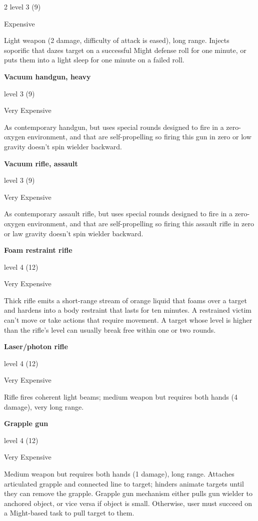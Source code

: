 \begin{multicols}{2}
level 3 (9) 

Expensive 

Light weapon (2 damage, difficulty of attack is eased), long range. Injects soporific that dazes target on a successful Might defense roll for one minute, or puts them into a light sleep for one minute on a failed roll. 

\textbf{Vacuum handgun, heavy} 

level 3 (9) 

Very Expensive 

As contemporary handgun, but uses special rounds designed to fire in a zero-oxygen environment, and that are self-propelling so firing this gun in zero or low gravity doesn’t spin wielder backward.

\textbf{Vacuum rifle, assault}

level 3 (9) 

Very Expensive 

As contemporary assault rifle, but uses special rounds designed to fire in a zero-oxygen environment, and that are self-propelling so firing this assault rifle in zero or law gravity doesn’t spin wielder backward.

\textbf{Foam restraint rifle} 

level 4 (12) 

Very Expensive 

Thick rifle emits a short-range stream of orange liquid that foams over a target and hardens into a body restraint that lasts for ten minutes. A restrained victim can’t move or take actions that require movement. A target whose level is higher than the rifle’s level can usually break free within one or two rounds. 

\textbf{Laser/photon rifle} 

level 4 (12) 

Very Expensive 

Rifle fires coherent light beams; medium weapon but requires both hands (4 damage), very long range. 

\textbf{Grapple gun} 

level 4 (12) 

Very Expensive 

Medium weapon but requires both hands (1 damage), long range. Attaches articulated grapple and connected line to target; hinders animate targets until they can remove the grapple. Grapple gun mechanism either pulls gun wielder to anchored object, or vice versa if object is small. Otherwise, user must succeed on a Might-based task to pull target to them. 


\end{multicols}

